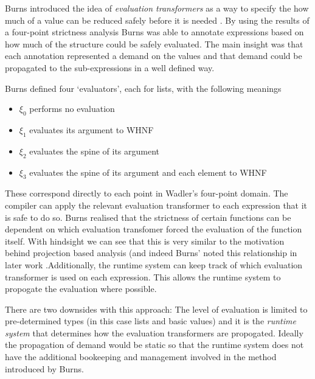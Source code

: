 Burns introduced the idea of \emph{evaluation transformers} as a way to specify
the how much of a value can be reduced safely before it is needed
\citep{burn1987evaluation}. By using the results of a four-point strictness
analysis Burns was able to annotate expressions based on how much of the
structure could be safely evaluated. The main insight was that each annotation
represented a demand on the values and that demand could be propagated to the
sub-expressions in a well defined way.

Burns defined four `evaluators', each for lists, with the following meanings


\begin{itemize}
    \item $\xi_{0}$ performs no evaluation
    \item $\xi_{1}$ evaluates its argument to WHNF
    \item $\xi_{2}$ evaluates the spine of its argument
    \item $\xi_{3}$ evaluates the spine of its argument and each element to WHNF
\end{itemize}

These correspond directly to each point in Wadler's four-point domain. The
compiler can apply the relevant evaluation transformer to each expression that
it is safe to do so. Burns realised that the strictness of certain functions
can be dependent on which evaluation transfomer forced the evaluation of the
function itself. With hindsight we can see that this is very similar to the
motivation behind projection based analysis (and indeed Burns' noted this
relationship in later work .Additionally, the runtime system can keep track of which evaluation
transformer is used on each expression. This allows the runtime system to
propogate the evaluation where possible.

There are two downsides with this approach: The level of evaluation is limited
to pre-determined types (in this case lists and basic values) and it is the
\emph{runtime system} that determines how the evaluation transformers are
propogated. Ideally the propagation of demand would be static so that the
runtime system does not have the additional bookeeping and management involved
in the method introduced by Burns.
